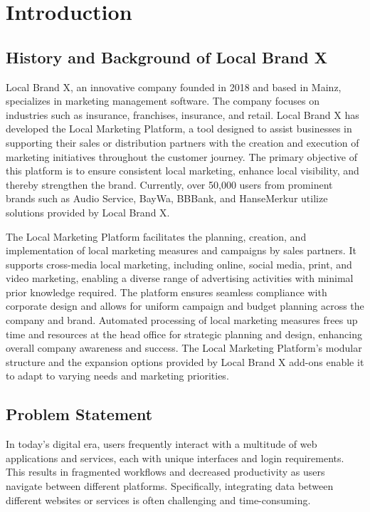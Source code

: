 \chapter{Introduction}\label{ch:introduction}

%
%
\section{History and Background of Local Brand X}\label{sec:intro:background}

Local Brand X, an innovative company founded in 2018 and based in Mainz, specializes in marketing management software. The company focuses on industries such as insurance, franchises, insurance, and retail. Local Brand X has developed the Local Marketing Platform, a tool designed to assist businesses in supporting their sales or distribution partners with the creation and execution of marketing initiatives throughout the customer journey. The primary objective of this platform is to ensure consistent local marketing, enhance local visibility, and thereby strengthen the brand. Currently, over 50,000 users from prominent brands such as Audio Service, BayWa, BBBank, and HanseMerkur utilize solutions provided by Local Brand X\cite{Local_Brand_X_AboutUs}.

The Local Marketing Platform facilitates the planning, creation, and implementation of local marketing measures and campaigns by sales partners. It supports cross-media local marketing, including online, social media, print, and video marketing, enabling a diverse range of advertising activities with minimal prior knowledge required. The platform ensures seamless compliance with corporate design and allows for uniform campaign and budget planning across the company and brand. Automated processing of local marketing measures frees up time and resources at the head office for strategic planning and design, enhancing overall company awareness and success\cite{Local_Marketing_Platform_2022}. The Local Marketing Platform's modular structure and the expansion options provided by Local Brand X add-ons enable it to adapt to varying needs and marketing priorities.

%
%
\section{Problem Statement}\label{sec:intro:problem_statement}
In today's digital era, users frequently interact with a multitude of web applications and services, each with unique interfaces and login requirements. This results in fragmented workflows and decreased productivity as users navigate between different platforms. Specifically, integrating data between different websites or services is often challenging and time-consuming.


